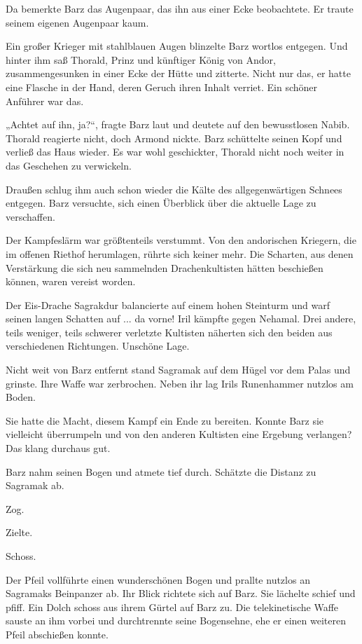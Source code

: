 Da bemerkte Barz das Augenpaar, das ihn aus einer Ecke beobachtete. Er traute seinem eigenen Augenpaar kaum.

Ein großer Krieger mit stahlblauen Augen blinzelte Barz wortlos entgegen. Und hinter ihm saß Thorald, Prinz und künftiger König von Andor, zusammengesunken in einer Ecke der Hütte und zitterte. Nicht nur das, er hatte eine Flasche in der Hand, deren Geruch ihren Inhalt verriet. Ein schöner Anführer war das.

„Achtet auf ihn, ja?“, fragte Barz laut und deutete auf den bewusstlosen Nabib. Thorald reagierte nicht, doch Armond nickte. Barz schüttelte seinen Kopf und verließ das Haus wieder. Es war wohl geschickter, Thorald nicht noch weiter in das Geschehen zu verwickeln.

Draußen schlug ihm auch schon wieder die Kälte des allgegenwärtigen Schnees entgegen. Barz versuchte, sich einen Überblick über die aktuelle Lage zu verschaffen.

Der Kampfeslärm war größtenteils verstummt. Von den andorischen Kriegern, die im offenen Riethof herumlagen, rührte sich keiner mehr. Die Scharten, aus denen Verstärkung die sich neu sammelnden Drachenkultisten hätten beschießen können, waren vereist worden.

Der Eis-Drache Sagrakdur balancierte auf einem hohen Steinturm und warf seinen langen Schatten auf ... da vorne! Iril kämpfte gegen Nehamal. Drei andere, teils weniger, teils schwerer verletzte Kultisten näherten sich den beiden aus verschiedenen Richtungen. Unschöne Lage.

Nicht weit von Barz entfernt stand Sagramak auf dem Hügel vor dem Palas und grinste. Ihre Waffe war zerbrochen. Neben ihr lag Irils Runenhammer nutzlos am Boden.

Sie hatte die Macht, diesem Kampf ein Ende zu bereiten. Konnte Barz sie vielleicht überrumpeln und von den anderen Kultisten eine Ergebung verlangen? Das klang durchaus gut.

Barz nahm seinen Bogen und atmete tief durch. Schätzte die Distanz zu Sagramak ab.

Zog.

Zielte.

Schoss.

Der Pfeil vollführte einen wunderschönen Bogen und prallte nutzlos an Sagramaks Beinpanzer ab. Ihr Blick richtete sich auf Barz. Sie lächelte schief und pfiff. Ein Dolch schoss aus ihrem Gürtel auf Barz zu. Die telekinetische Waffe sauste an ihm vorbei und durchtrennte seine Bogensehne, ehe er einen weiteren Pfeil abschießen konnte.

